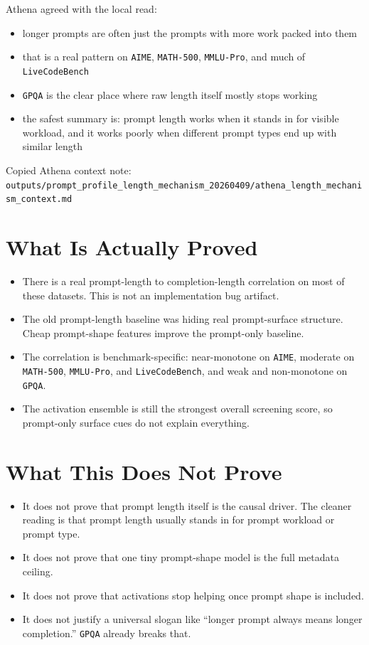 \documentclass[11pt]{article}
\begin{document}
Athena agreed with the local read:
\begin{itemize}[leftmargin=1.5em]
\item longer prompts are often just the prompts with more work packed into them
\item that is a real pattern on \texttt{AIME}, \texttt{MATH-500}, \texttt{MMLU-Pro}, and much of \texttt{LiveCodeBench}
\item \texttt{GPQA} is the clear place where raw length itself mostly stops working
\item the safest summary is: prompt length works when it stands in for visible workload, and it works poorly when different prompt types end up with similar length
\end{itemize}

Copied Athena context note: \texttt{outputs/prompt\_profile\_length\_mechanism\_20260409/athena\_length\_mechanism\_context.md}

\section*{What Is Actually Proved}
\begin{itemize}[leftmargin=1.5em]
\item There is a real prompt-length to completion-length correlation on most of these datasets. This is not an implementation bug artifact.
\item The old prompt-length baseline was hiding real prompt-surface structure. Cheap prompt-shape features improve the prompt-only baseline.
\item The correlation is benchmark-specific: near-monotone on \texttt{AIME}, moderate on \texttt{MATH-500}, \texttt{MMLU-Pro}, and \texttt{LiveCodeBench}, and weak and non-monotone on \texttt{GPQA}.
\item The activation ensemble is still the strongest overall screening score, so prompt-only surface cues do not explain everything.
\end{itemize}

\section*{What This Does Not Prove}
\begin{itemize}[leftmargin=1.5em]
\item It does not prove that prompt length itself is the causal driver. The cleaner reading is that prompt length usually stands in for prompt workload or prompt type.
\item It does not prove that one tiny prompt-shape model is the full metadata ceiling.
\item It does not prove that activations stop helping once prompt shape is included.
\item It does not justify a universal slogan like ``longer prompt always means longer completion.'' \texttt{GPQA} already breaks that.
\end{itemize}
\end{document}
